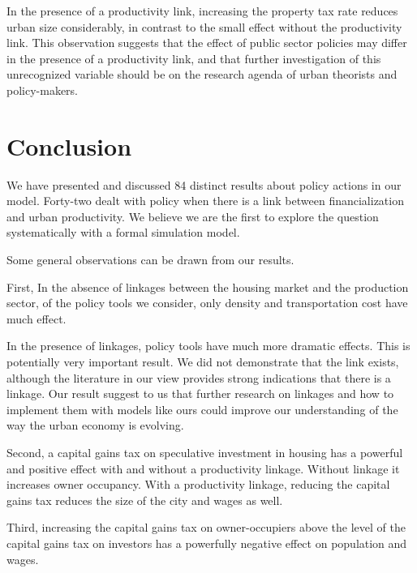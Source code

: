 In the presence of a productivity link, increasing the property tax rate reduces urban size considerably, in contrast to the small effect without the productivity link. This observation suggests that the effect of public sector policies may differ in the presence of a productivity link, and that further investigation of this unrecognized variable should be on the research agenda of urban theorists and policy-makers.

\section{Conclusion}
We have presented and discussed 84 distinct results about policy actions in our model. Forty-two dealt with policy when there is a link between financialization and urban productivity. We believe we are the first to explore the question systematically with a formal simulation model.


 Some general observations can be drawn from our results.

First, In the absence of linkages between the housing market and the production sector, of the policy tools we consider, only density and transportation cost have much effect. 

In the presence of linkages, policy tools have much more dramatic effects. This is potentially very important result. 
We did not demonstrate that the link exists, although the literature in our view provides strong indications that there is a linkage.  Our result suggest to us that further research on linkages and how to implement them with models like ours could improve our understanding of the way the urban economy is evolving.   


Second, a capital gains tax on speculative investment in housing has a powerful and positive effect with and without a productivity linkage. Without linkage it increases owner occupancy. With a productivity linkage, reducing the capital gains tax reduces the size of the city and wages as well. 

Third, increasing the capital gains tax on owner-occupiers above the level of the capital gains tax on investors has a powerfully negative effect on population and wages.

